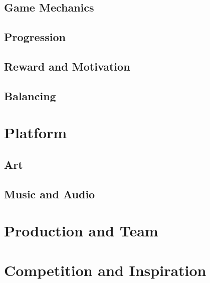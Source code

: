 \documentclass[12pt,journal,compsoc]{IEEEtran}
\begin{document}
\subsection{Game Mechanics} 
\subsection{Progression} 
\subsection{Reward and Motivation} 
\subsection{Balancing} 

\section{Platform} 
\subsection{Art} 
\subsection{Music and Audio}

\section{Production and Team} 
\section{Competition and Inspiration}


{}

\end{document}
